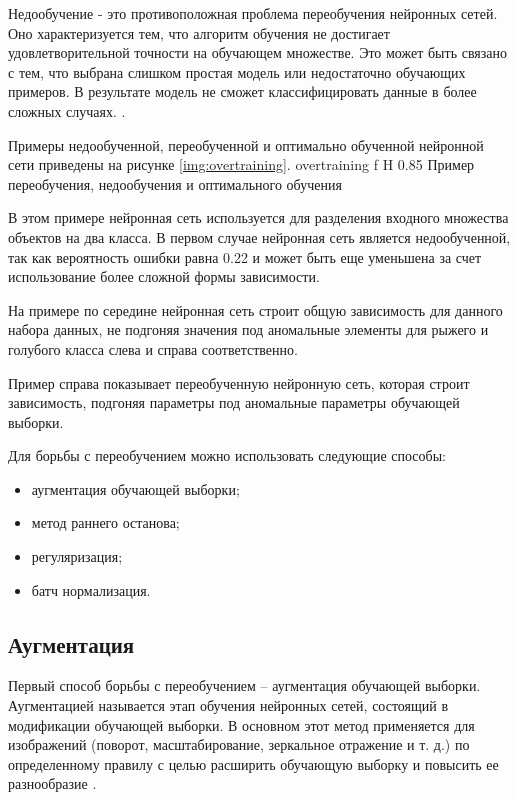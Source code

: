 Недообучение - это противоположная проблема переобучения нейронных сетей. Оно характеризуется тем, что алгоритм обучения не достигает удовлетворительной точности на обучающем множестве. Это может быть связано с тем, что выбрана слишком простая модель или недостаточно обучающих примеров. В результате модель не сможет классифицировать данные в более сложных случаях. \cite{overtraining1}.

Примеры недообученной, переобученной и оптимально обученной нейронной сети приведены на рисунке \ref{img:overtraining}.
{overtraining} %
{f} %
{H} %
{0.85\textwidth} %
{Пример переобучения, недообучения и оптимального обучения} %

В этом примере нейронная сеть используется для разделения входного множества объектов на два класса. В первом случае нейронная сеть является недообученной, так как вероятность ошибки равна 0.22 и может быть еще уменьшена за счет использование более сложной формы зависимости.

На примере по середине нейронная сеть строит общую зависимость для данного набора данных, не подгоняя значения под аномальные элементы для рыжего и голубого класса слева и справа соответственно.

Пример справа показывает переобученную нейронную сеть, которая строит зависимость, подгоняя параметры под аномальные параметры обучающей выборки.

Для борьбы с переобучением можно использовать следующие способы:
\begin{itemize}
	\item аугментация обучающей выборки;
	\item метод раннего останова;
	\item регуляризация;
	\item батч нормализация.
\end{itemize}

\subsection{Аугментация}
Первый способ борьбы с переобучением -- аугментация обучающей выборки. Аугментацией называется этап обучения нейронных сетей, состоящий в модификации обучающей выборки. 
В основном этот метод применяется для изображений (поворот, масштабирование, зеркальное отражение и т. д.) по определенному правилу с целью расширить обучающую выборку и повысить ее разнообразие \cite{augmentation}.

